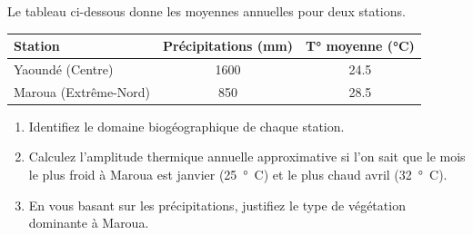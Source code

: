 \documentclass[11pt]{article}
\begin{document}
\begin{exercice}
Le tableau ci-dessous donne les moyennes annuelles pour deux stations.
\begin{center}
\begin{tabular}{|l|c|c|}
\hline
\textbf{Station} & \textbf{Précipitations (mm)} & \textbf{T° moyenne (°C)} \\
\hline
Yaoundé (Centre) & \SI{1600}{} & \SI{24.5}{} \\
Maroua (Extrême-Nord) & \SI{850}{} & \SI{28.5}{} \\
\hline
\end{tabular}
\end{center}
\begin{enumerate}
    \item Identifiez le domaine biogéographique de chaque station.
    \item Calculez l'amplitude thermique annuelle approximative si l'on sait que le mois le plus froid à Maroua est janvier (\SI{25}{°C}) et le plus chaud avril (\SI{32}{°C}).
    \item En vous basant sur les précipitations, justifiez le type de végétation dominante à Maroua.
\end{enumerate}
\end{exercice}
\end{document}
